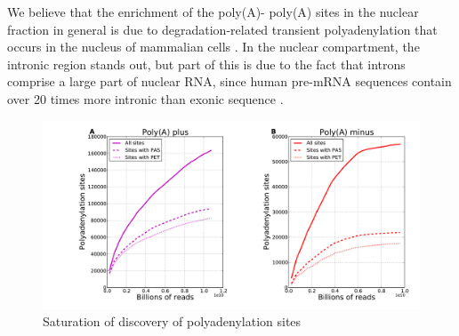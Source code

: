 We believe that the enrichment of the poly(A)- poly(A) sites in the nuclear
fraction in general is due to degradation-related transient polyadenylation
that occurs in the nucleus of mammalian cells \cite{lemay_nuclear_2010,
lacava_rna_2005, wyers_cryptic_2005}. In the nuclear compartment, the intronic
region stands out, but part of this is due to the fact that introns comprise a
large part of nuclear RNA, since human pre-mRNA sequences contain over 20 times
more intronic than exonic sequence \cite{venter_sequence_2001}.

\begin{figure}[htb]
	\begin{center}
		\includegraphics[scale=0.3]{figures/polyadenylation/Saturation_plot_2+.pdf}
	\end{center}
	\caption{Saturation of discovery of polyadenylation sites}
	\label{fig:saturation}
\end{figure}

